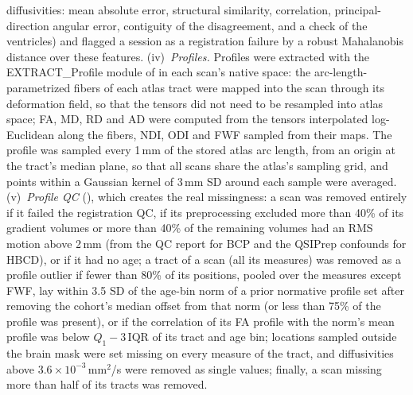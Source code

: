 \documentclass[11pt]{article}
\begin{document}
diffusivities: mean absolute error, structural similarity, correlation, principal-direction angular error, contiguity of the disagreement,
and a check of the ventricles) and flagged a session as a registration failure by a robust Mahalanobis distance over these
features. (iv)~\emph{Profiles.} Profiles were extracted with the EXTRACT\_Profile module of 
in each scan's native space: the arc-length-parametrized fibers of each atlas tract were mapped into the scan through
its deformation field, so that the tensors did not need to be resampled into atlas space; FA, MD, RD and AD were computed
from the tensors interpolated log-Euclidean along the fibers, NDI, ODI and FWF sampled from their maps. The profile was
sampled every 1\,mm of the stored atlas arc length, from an origin at the tract's median plane, so that all scans share the
atlas's sampling grid, and points within a Gaussian kernel of 3\,mm SD around each sample were averaged. (v)~\emph{Profile QC}
(), which creates the real missingness: a scan was removed entirely if it failed the
registration QC, if its preprocessing excluded more than 40\% of its gradient volumes or more than 40\% of the remaining
volumes had an RMS motion above 2\,mm (from the  QC report for BCP and the QSIPrep confounds for HBCD), or if it had no age; a tract of a scan (all its measures) was removed as a profile outlier if fewer than
80\% of its positions, pooled over the measures except FWF, lay within 3.5 SD of the age-bin norm of a prior normative
profile set after removing the cohort's median offset from that norm (or less than 75\% of the profile was present), or if
the correlation of its FA profile with the norm's mean profile was below $Q_1 - 3\,\mathrm{IQR}$ of its tract and age bin;
locations sampled outside the brain mask were set missing on every measure of the tract, and diffusivities above
$3.6\times10^{-3}$\,mm$^2$/s were removed as single values; finally, a scan missing more than half of its tracts was
removed.
\end{document}
